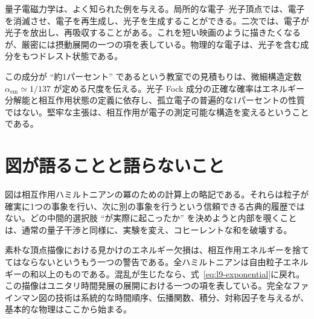 \begin{classroomqa}
\end{classroomqa}

量子電磁力学は、よく知られた例を与える。局所的な電子--光子頂点では、電子を消滅させ、電子を再生成し、光子を生成することができる。二次では、電子が光子を放出し、再吸収することがある。これを短い映画のように描きたくなるが、厳密には摂動展開の一つの項を表している。物理的な電子は、光子を含む成分をもつドレスト状態である。

この成分が ``約1パーセント'' であるという教室での見積もりは、微細構造定数 \(\alpha_{\mathrm{em}}\simeq 1/137\) が定める尺度を伝える。光子 Fock 成分の正確な確率はエネルギー分解能と相互作用状態の定義に依存し、孤立電子の普遍的な1パーセントの性質ではない。堅牢な主張は、相互作用が電子の測定可能な構造を変えるということである。

\section{図が語ることと語らないこと}

図は相互作用ハミルトニアンの冪のための計算上の略記である。それらは粒子が確実に1つの事象を行い、次に別の事象を行うという信頼できる古典的履歴ではない。どの中間的選択肢 ``が実際に起こったか'' を決めようと内部を覗くことは、通常の量子干渉と同様に、実験を変え、コヒーレントな和を破壊する。

\begin{classroomqa}
\end{classroomqa}

素朴な頂点描像における見かけのエネルギー欠損は、相互作用エネルギーを捨ててはならないというもう一つの警告である。全ハミルトニアンは自由粒子エネルギーの和以上のものである。混乱が生じたなら、式~\eqref{eq:l9-exponential}に戻れ。この描像はユニタリ時間発展の展開における一つの項を表している。完全なファインマン図の技術は系統的な時間順序、伝播関数、積分、対称因子を与えるが、基本的な物理はここから始まる。

